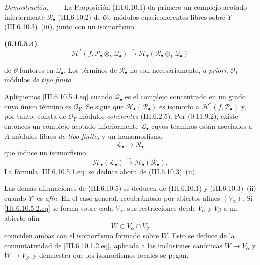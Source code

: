\documentclass[10pt,oneside]{book}
\newcommand{\sh}[1]{\mathscr{#1}}
\newcommand{\sref}[2][]{\textup{(#2)}}
\newenvironment{env}[1][]{\par\medskip\noindent\textbf{(#1)}\ }{\par}
\newenvironment{proof}{\par\medskip\noindent\textit{Demostración. ---\ }}{\par}
\begin{document}
\begin{proof}
La Proposición \sref{III.6.10.1} da primero un complejo acotado
inferiormente $\sh R_\bullet$ \sref{III.6.10.2} de
$\sh O_Y$-módulos cuasicoherentes libres sobre $Y$
\sref{III.6.10.3}~(iii), junto con un isomorfismo
\begin{env}[6.10.5.4]
\label{III.6.10.5.4}
\[
  \sh H^*
  (f,\sh P_\bullet\otimes_Y\sh Q_\bullet)
  \xrightarrow{\sim}
  \sh H_\bullet
  (\sh R_\bullet\otimes_Y\sh Q_\bullet)
  \tag{6.10.5.4}\label{III.6.10.5.4.eq}
\]
\end{env}
de $\partial$-funtores en $\sh Q_\bullet$. Los términos de
$\sh R_\bullet$ no son necesariamente, \emph{a priori},
$\sh O_Y$-módulos \emph{de tipo finito}.

Apliquemos \eqref{III.6.10.5.4.eq} cuando $\sh Q_\bullet$ es el
complejo concentrado en un grado cuyo único término es $\sh O_Y$.
Se sigue que $\sh H_\bullet(\sh R_\bullet)$ es isomorfo a
$\sh H^*(f,\sh P_\bullet)$ y, por tanto, consta de
$\sh O_Y$-módulos \emph{coherentes} \sref{III.6.2.5}. Por
\sref[0]{0.11.9.2}, existe entonces un complejo acotado
inferiormente $\sh L_\bullet$ cuyos términos están asociados a
$A$-módulos libres \emph{de tipo finito}, y un homomorfismo
\[
  \sh L_\bullet\longrightarrow\sh R_\bullet
\]
que induce un isomorfismo
\[
  \sh H_\bullet(\sh L_\bullet)
  \xrightarrow{\sim}
  \sh H_\bullet(\sh R_\bullet).
\]
La fórmula \eqref{III.6.10.5.1.eq} se deduce ahora de
\sref{III.6.10.3}~(ii).

Las demás afirmaciones de \sref{III.6.10.5} se deducen de
\sref{III.6.10.1} y \sref{III.6.10.3}~(ii) cuando $Y'$ es \emph{afín}.
En el caso general, recubrámoslo por abiertos afines $(V_\alpha)$.
Si \eqref{III.6.10.5.2.eq} se forma sobre cada $V_\alpha$, sus
restricciones desde $V_\alpha$ y $V_\beta$ a un abierto afín
\[
  W\subset V_\alpha\cap V_\beta
\]
coinciden ambas con el isomorfismo formado sobre $W$. Esto se
deduce de la conmutatividad de \eqref{III.6.10.1.2.eq}, aplicada
a las inclusiones canónicas $W\to V_\alpha$ y $W\to V_\beta$, y
demuestra que los isomorfismos locales se pegan.
\end{proof}
\end{document}
